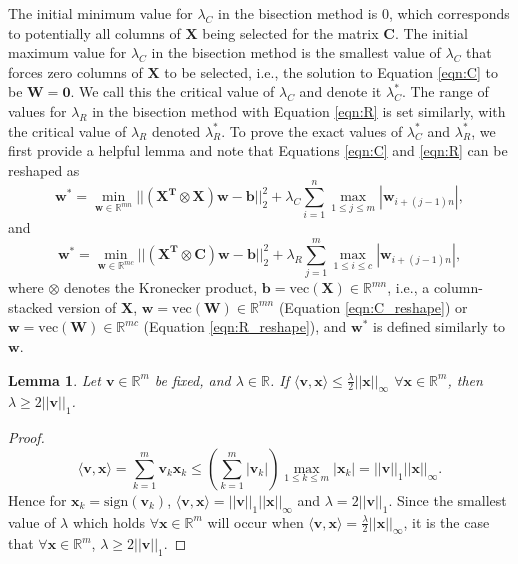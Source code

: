 \documentclass[12pt]{article}
\newtheorem{lemma}[theorem]{Lemma}
\begin{document}
The initial minimum value for $\lambda_C$ in the bisection method is $0$, which corresponds to potentially all columns of $\mathbf{X}$ being selected for the matrix $\mathbf{C}$.  The initial maximum value for $\lambda_C$ in the bisection method is the smallest value of $\lambda_C$ that forces zero columns of $\mathbf{X}$ to be selected, i.e., the solution to Equation \ref{eqn:C} to be $\mathbf{W} = \mathbf{0}$.  We call this the critical value of $\lambda_C$ and denote it $\lambda_C^*$.  The range of values for $\lambda_R$ in the bisection method with Equation \ref{eqn:R} is set similarly, with the critical value of $\lambda_R$ denoted $\lambda_R^*$.  To prove the exact values of $\lambda_C^*$ and $\lambda_R^*$, we first provide a helpful lemma and note that Equations \ref{eqn:C} and \ref{eqn:R} can be reshaped as
\begin{equation}
\label{eqn:C_reshape}
\mathbf{w^*} = \min_{\mathbf{w} \in \mathbb{R}^{mn}} ||\mathbf{(X^T \otimes X) w}-\mathbf{b}||^2_2 + \lambda_C \sum_{i=1}^n \max_{1 \leq j \leq m} |\mathbf{w}_{i+(j-1)n}|,
\end{equation}
and 
\begin{equation}
\label{eqn:R_reshape}
\mathbf{w^*} = \min_{\mathbf{w} \in \mathbb{R}^{mc}} ||\mathbf{(\mathbf{X}^T \otimes \mathbf{C})w}-\mathbf{b}||^2_2 + \lambda_R \sum_{j=1}^m \max_{1 \leq i \leq c} |\mathbf{w}_{i+(j-1)n}|,
\end{equation}
where $\otimes$ denotes the Kronecker product, $\mathbf{b} = \text{vec}(\mathbf{X}) \in \mathbb{R}^{mn}$, i.e., a column-stacked version of $\mathbf{X}$, $\mathbf{w} = \text{vec}(\mathbf{W}) \in \mathbb{R}^{mn}$ (Equation \ref{eqn:C_reshape}) or $\mathbf{w} = \text{vec}(\mathbf{W}) \in \mathbb{R}^{mc}$ (Equation \ref{eqn:R_reshape}), and $\mathbf{w}^*$ is defined similarly to $\mathbf{w}$. 

\begin{lemma}
\label{lemma:rx}
Let $\mathbf{v} \in \mathbb{R}^{m}$ be fixed, and $\lambda \in \mathbb{R}$.  If $\langle \mathbf{v},\mathbf{x} \rangle \leq \frac{\lambda}{2}||\mathbf{x}||_\infty$ $\forall \mathbf{x} \in \mathbb{R}^{m}$, then $\lambda \geq 2 ||\mathbf{v}||_1$.
\end{lemma}

\begin{proof}
\[
\langle \mathbf{v},\mathbf{x} \rangle = \sum_{k=1}^m \mathbf{v}_k \mathbf{x}_k \leq \left( \sum_{k=1}^m |\mathbf{v}_k| \right) \max_{1 \leq k \leq m} |\mathbf{x}_k| = ||\mathbf{v}||_1 ||\mathbf{x}||_\infty.
\]
Hence for $\mathbf{x}_k = \text{sign}(\mathbf{v}_k)$, $\langle \mathbf{v},\mathbf{x} \rangle = ||\mathbf{v}||_1 ||\mathbf{x}||_\infty$ and $\lambda = 2||\mathbf{v}||_1$.  Since the smallest value of $\lambda$ which holds $\forall \mathbf{x} \in \mathbb{R}^{m}$ will occur when $\langle \mathbf{v},\mathbf{x} \rangle = \frac{\lambda}{2}||\mathbf{x}||_\infty$, it is the case that $\forall \mathbf{x} \in \mathbb{R}^{m}$, $\lambda \geq 2 ||\mathbf{v}||_1$.
\end{proof}
\end{document}
